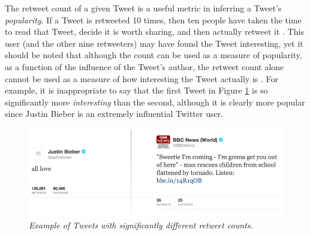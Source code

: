 The retweet count of a given Tweet is a useful metric in inferring a Tweet's \textit{popularity}. If a Tweet is retweeted 10 times, then ten people have taken the time to read that Tweet, decide it is worth sharing, and then actually retweet it \cite{uysal11}. This user (and the other nine retweeters) may have found the Tweet interesting, yet it should be noted that although the count can be used as a measure of popularity, as a function of the influence of the Tweet's author, the retweet count alone cannot be used as a measure of how interesting the Tweet actually is \cite{naveed11}. For example, it is inappropriate to say that the first Tweet in Figure \ref{fig:tweet_comparison} is so significantly more \textit{interesting} than the second, although it is clearly more popular since Justin Bieber is an extremely influential Twitter user.

\begin{figure}[h]
\centering
\includegraphics[scale=0.55]{2.Background/Media/compared_tweets.png} 
\caption{\textit{Example of Tweets with significantly different retweet counts.}}
\label{fig:tweet_comparison}
\end{figure}

